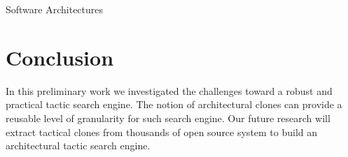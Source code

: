 \documentclass{sig-alternate}
\begin{document}



 Software Architectures









\section{Conclusion}
\label{sec:Conclusion}
In this preliminary work we investigated the challenges toward a robust and practical tactic search engine. The notion of architectural clones can provide a reusable level of granularity for  such search engine. Our future research will extract tactical clones from thousands of open source system to build an architectural tactic search engine.









\balance





\end{document}
